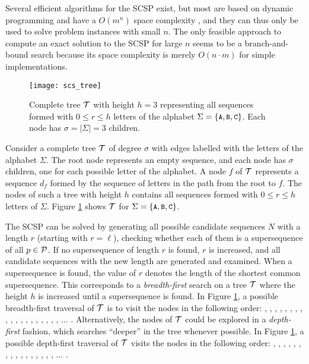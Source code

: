 Several efficient algorithms for the SCSP exist, but most are based on dynamic
programming and have a $O(m^n)$ space complexity \citep{Itoga1981,Foulser1992},
and they can thus only be used to solve problem instances with small $n$. The
only feasible approach to compute an exact solution to the SCSP for large $n$
seems to be a branch-and-bound search because its space complexity is merely
$O(n \cdot m)$ for simple implementations.

\begin{figure}[t]\centering
\texttt{[image: scs\_tree]}
\caption{\label{fig:scs_tree}%
  Complete tree ${\mathcal{T}}$ with height $h = 3$ representing all sequences formed
  with $0 \leq r \leq h$ letters of the alphabet $\Sigma = \{\text{\small{\tt A}},\text{\small{\tt B}},\text{\small{\tt C}}\}$.
  Each node has $\sigma = | \Sigma | = 3$ children.}
\end{figure}

Consider a complete tree ${\mathcal{T}}$ of degree $\sigma$ with edges labelled with the
letters of the alphabet $\Sigma$. The root node represents an empty sequence,
and each node has $\sigma$ children, one for each possible letter of the
alphabet. A node $f$ of ${\mathcal{T}}$ represents a sequence $d_f$ formed by the
sequence of letters in the path from the root to $f$. The nodes of such a tree
with height $h$ contains all sequences formed with $0 \leq r \leq h$ letters of
$\Sigma$. Figure \ref{fig:scs_tree} shows ${\mathcal{T}}$ for
$\Sigma = \{\text{\small{\tt A}},\text{\small{\tt B}},\text{\small{\tt C}}\}$.

The SCSP can be solved by generating all possible candidate sequences $N$ with a
length $r$ (starting with $r = \ell$), checking whether each of them is a
supersequence of all $p \in {\mathcal{P}}$. If no supersequence of length $r$ is
found, $r$ is increased, and all candidate sequences with the new length
are generated and examined. When a supersequence is found, the value of $r$
denotes the length of the shortest common supersequence. This corresponds to a
\textit{breadth-first} search on a tree ${\mathcal{T}}$ where the height $h$ is
increased until a supersequence is found. In Figure \ref{fig:scs_tree}, a
possible breadth-first traversal of ${\mathcal{T}}$ is to visit the nodes in the
following order: , , , , , ,
, , , , , , ,
, , , , , , $\ldots$
. Alternatively, the nodes of ${\mathcal{T}}$ could be explored in a
\textit{depth-first} fashion, which searches ``deeper'' in the tree whenever
possible. In Figure \ref{fig:scs_tree}, a possible depth-first traversal of
${\mathcal{T}}$ visits the nodes in the following order: , , ,
, , , , , , ,
, , , , , , $\ldots$
.

